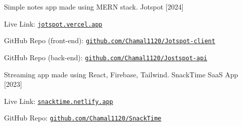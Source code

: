 

\begin{cventries}

  \cventry
    {Simple notes app made using MERN stack.} %
    {Jotspot [2024]} %
    {} %
    {} %
    {
      \begin{cvitems} %
        \item Live Link: \href{https://jotspot.vercel.app/}{\nolinkurl{jotspot.vercel.app}}
        \item GitHub Repo (front-end): \href{https://github.com/Chamal1120/Jotspot-client}{\nolinkurl{github.com/Chamal1120/Jotspot-client}}
        \item GitHub Repo (back-end): \href{https://github.com/Chamal1120/Jostspot-api}{\nolinkurl{github.com/Chamal1120/Jostspot-api}}
      \end{cvitems}
    }

  \cventry
    {Streaming app made using React, Firebase, Tailwind.} %
    {SnackTime SaaS App [2023]} %
    {} %
    {} %
    {
      \begin{cvitems} %
        \item Live Link: \href{https://snacktime.netlify.app}{\nolinkurl{snacktime.netlify.app}}
        \item GitHub Repo: \href{https://github.com/Chamal1120/SnackTime}{\nolinkurl{github.com/Chamal1120/SnackTime}}
      \end{cvitems}
    }


\end{cventries}
